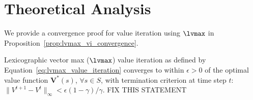 \section{Theoretical Analysis}
\label{sec:theoretical_analysis}

We provide a convergence proof for value iteration using $\lvmax$ in Proposition~\ref{prop:lvmax_vi_convergence}.

\begin{proposition}
    \label{prop:lvmax_vi_convergence}
    Lexicographic vector max ($\lvmax$) value iteration as defined by Equation~\ref{eq:lvmax_value_iteration} converges to within $\epsilon > 0$ of the optimal value function $\mathbf{V}^*(s)$, $\forall s \in S$, with termination criterion at time step $t$: $\|V^{t+1} - V^t\|_\infty < \epsilon (1 - \gamma) / \gamma$. FIX THIS STATEMENT
\end{proposition}

